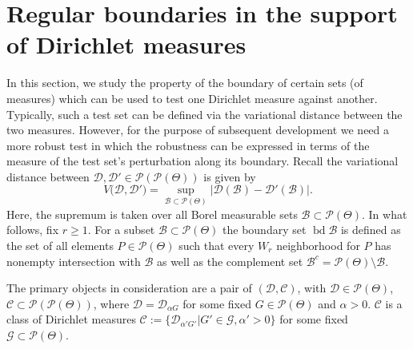 \documentclass[MSNbibl,number,citesort]{arxbj}
\newcommand{\Dcal}{\mathcal{D}}
\newcommand{\Pcal}{\mathscr{P}}
\newcommand{\Gcal}{\mathscr{G}}
\newcommand{\BB}{\mathscr{B}}
\newcommand{\Prob}{\mathbb{P}}
\newcommand{\bd}{\operatorname{bd}}
\newcommand{\DP}{\mathscr{D}}
\newcommand{\Cclass}{\mathscr{C}}
\newcommand{\Wr}{W_r}
\newcommand{\Gz}{G_0}
\newcommand{\Bky}{B_K}
\begin{document}
%
%

\section{Regular boundaries in the support of Dirichlet measures}
\label{Sec-boundary}

In this section, we study the property of the boundary of certain sets
(of measures)
which can be used to test one Dirichlet measure against
another. Typically, such a test set
can be defined via the variational distance between
the two measures.
However, for the purpose of subsequent
development we need a more robust test in which the robustness
can be expressed in terms of the measure of the
test set's perturbation along its boundary.
%
Recall the variational distance between
$\Dcal, \Dcal' \in\Pcal(\Pcal(\Theta))$ is given by
%
\[
V \bigl(\Dcal, \Dcal' \bigr) = \sup_{\BB\subset\Pcal(\Theta)} \bigl|
\Dcal(\BB) - \Dcal'(\BB)\bigr|.
\]
%
Here, the supremum is taken over all Borel measurable sets
$\BB\subset\Pcal(\Theta)$.
In what follows, fix $r\geq1$. For a subset $\BB\subset\Pcal(\Theta)$
the boundary set $\bd\BB$ is defined as the set of all elements $P
\in
\Pcal(\Theta)$
such that every $\Wr$ neighborhood for $P$ has nonempty intersection
with $\BB$ as well as the complement set $\BB^c = \Pcal(\Theta
)\setminus\BB$.

The primary objects in consideration are a pair of $(\Dcal,\Cclass)$,
with $\Dcal\in\Pcal(\Theta)$, $\Cclass\subset\Pcal(\Pcal(\Theta
))$, where
$\Dcal= \DP_{\alpha G}$ for some fixed $G \in\Pcal(\Theta)$ and
$\alpha> 0$.
$\Cclass$ is a class of Dirichlet measures
$\Cclass:= \{\DP_{\alpha' G'}| G' \in\Gcal, \alpha' > 0\}$
for some fixed $\Gcal\subset\Pcal(\Theta)$.
\end{document}
